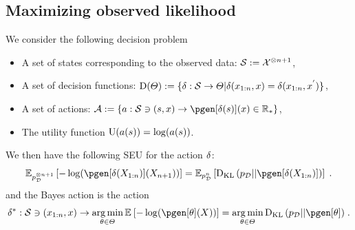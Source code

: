 \subsection{Maximizing observed likelihood}
We consider the following decision problem
\begin{itemize}
    \item A set of states corresponding to the observed data: $\mathcal{S} := {\mathcal{X}}^{\otimes n + 1}$,
    \item A set of decision functions: $\mathrm{D}(\varTheta) := \{\delta: \mathcal{S} \rightarrow \varTheta | \delta({x}_{1:n},x) = \delta({x}_{1:n},{x}^{'})\}$,
    \item A set of actions: $\actionset \eqdef \{a: \stateset \ni (s, \lstate) \rightarrow \pgen[\decfun(s)](\lstate) \in \rsetpos \}$,
    \item The utility function $\mathrm{U}(a(s)) = \log(a(s))$.
\end{itemize}
We then have the following SEU for the action $\delta$:
\begin{equation}
    \label{eq:obslik_seu}
    \PE{\pdata^{\tensprod n+1}}{-\log(\pgen[\decfun(\chunk{\state}{1}{\ndata})](\state_{\ndata+1}))} = \PE{\pdata^{\ndata}}{\kl{\pdata}{\pgen[\decfun(\chunk{\state}{1}{\ndata})]}}\eqsp.
\end{equation}
and the Bayes action is the action
\begin{equation}
    \label{eq:obslik_bayes}
    \tmin{\decfun}: \stateset \ni (\chunk{\lstate}{1}{n}, \lstate) \rightarrow \argmin_{\param \in \paramset} \PE{}{-\log(\pgen[\param](\state))} = \argmin_{\param \in \paramset} {\kl{\pdata}{\pgen[\param]}}\eqsp.
\end{equation}

